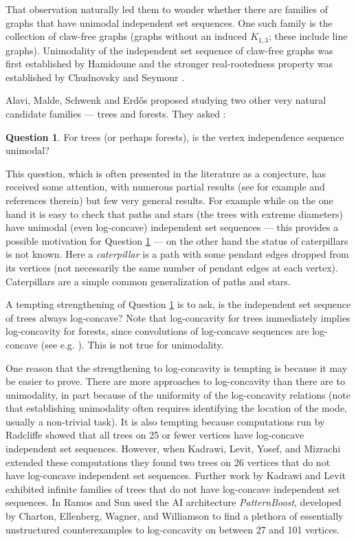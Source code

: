 \documentclass[12pt]{article}
\theoremstyle{definition}
\theoremstyle{definition}
\theoremstyle{definition}
\newtheorem{question}[thm]{Question}
\theoremstyle{definition}
\theoremstyle{definition}
\theoremstyle{definition}
\theoremstyle{definition}
\theoremstyle{definition}
\theoremstyle{remark}
\begin{document}
That observation naturally led them to wonder whether there are families of graphs that have unimodal independent set sequences. One such family is the collection of claw-free graphs (graphs without an induced $K_{1,3}$; these include line graphs). Unimodality of the independent set sequence of claw-free graphs was first established by Hamidoune \cite{H1990} and the stronger real-rootedness property was established by Chudnovsky and Seymour \cite{CS2007}.   

Alavi, Malde, Schwenk and Erd\H{o}s proposed studying two other very natural candidate families --- trees and forests. They asked \cite[Problem 3]{AMSE1987}:
\begin{question} \label{question-AMSE}
For trees (or perhaps forests), is the vertex independence sequence unimodal?
\end{question}
This question, which is often presented in the literature as a conjecture, has received some attention, with numerous partial results (see for example \cite{BES2018, BG2021, BRGGGS2019, B2018, GH2018, H2020, LM2002, WZ2011, Z2007} and references therein) but few very general results. For example while on the one hand it is easy to check that paths and stars (the trees with extreme diameters) have unimodal (even log-concave) independent set sequences --- this provides a possible motivation for Question \ref{question-AMSE} --- on the other hand the status of caterpillars is not known. Here a {\it caterpillar} is a path with some pendant edges dropped from its vertices (not necessarily the same number of pendant edges at each vertex). Caterpillars are a simple common generalization of paths and stars.   

A tempting strengthening of Question \ref{question-AMSE} is to ask, is the independent set sequence of trees always log-concave? Note that log-concavity for trees immediately implies log-concavity for forests, since convolutions of log-concave sequences are log-concave (see e.g. \cite{B2016}). This is not true for unimodality. 

One reason that the strengthening to log-concavity is tempting is because it may be easier to prove. There are more approaches to log-concavity than there are to unimodality, in part because of the uniformity of the log-concavity relations (note that establishing unimodality often requires identifying the location of the mode, usually a non-trivial task). It is also tempting because computations run by Radcliffe \cite{R} showed that all trees on 25 or fewer vertices have log-concave independent set sequences.  However, when Kadrawi, Levit, Yosef, and Mizrachi extended these computations \cite{KLYM2023} they found two trees on 26 vertices that do not have log-concave independent set sequences. Further work by Kadrawi and Levit \cite{KL2023} exhibited infinite families of trees that do not have log-concave independent set sequences. In \cite{RS2025} Ramos and Sun used the AI architecture {\it PatternBoost}, developed by Charton, Ellenberg, Wagner, and Williamson \cite{CEWW2024} to find a plethora of essentially unstructured counterexamples to log-concavity on between 27 and 101 vertices. 
\end{document}
